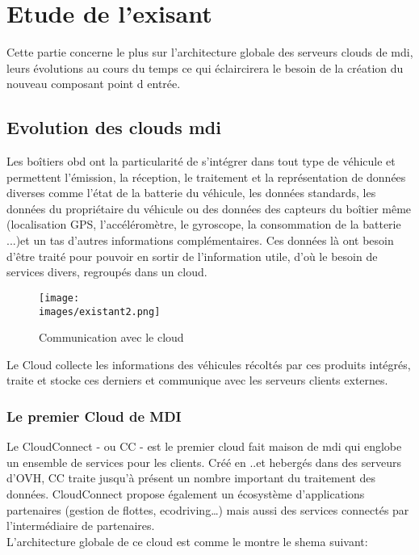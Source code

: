 \section{Etude de l'exisant}
   Cette partie concerne le plus sur l'architecture globale des serveurs clouds de \gls{mdi}, leurs évolutions 
   au cours du temps ce qui éclaircirera le besoin de la création du nouveau composant 
   point d entrée.  

   \subsection{Evolution des clouds \gls{mdi}}
   Les boîtiers \gls{obd} ont la particularité de s’intégrer dans tout type de véhicule et permettent
   l’émission, la réception, le traitement et la représentation de données diverses comme
   l'état de la batterie du véhicule, les données standards, les données du propriétaire du
   véhicule ou des données des capteurs du boîtier même (localisation GPS,
   l’accéléromètre, le gyroscope, la consommation de la batterie ...)et un tas d'autres informations complémentaires.
   Ces données là ont besoin d'être traité pour pouvoir en sortir de l'information utile, d'où le besoin de services divers, regroupés 
   dans un cloud. \\ [0.3cm]
     \begin{figure}[ht]
        \centering
        \texttt{[image: \\images/existant2.png]}
        \caption{Communication avec le cloud}
    \end{figure}
        
        Le Cloud collecte les informations des véhicules récoltés par ces produits intégrés, traite et stocke ces 
   derniers et communique avec les serveurs clients externes.\\[0.3cm]


    \subsubsection{Le premier Cloud de MDI}
       
    
         Le CloudConnect - ou \gls{CC} - est le premier cloud fait maison de \gls{mdi} qui englobe un ensemble 
        de services pour les clients. Créé en ..et hebergés dans des serveurs d'OVH, \gls{CC} traite 
        jusqu'à présent un nombre important du traitement des données. CloudConnect propose également un écosystème d’applications partenaires (gestion de flottes, ecodriving…) 
        mais aussi des services connectés par l’intermédiaire de partenaires. \\
        L'architecture globale de ce cloud est comme le montre  le shema suivant: 

